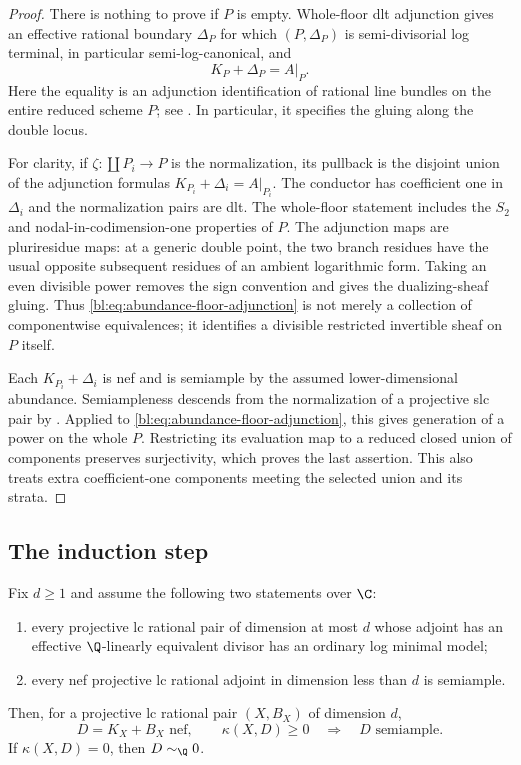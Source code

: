 \begin{proof}
There is nothing to prove if $P$ is empty.  Whole-floor dlt
adjunction gives an effective rational boundary $\Delta_P$ for
which $(P,\Delta_P)$ is semi-divisorial log terminal, in particular
semi-log-canonical, and
\begin{equation}
 K_P+\Delta_P=A|_P.
 \label{bl:eq:abundance-floor-adjunction}
\end{equation}
Here the equality is an adjunction identification of rational line
bundles on the entire reduced scheme $P$; see
\cite[Remark~2.7]{FujinoGongyo2014}.  In particular, it specifies the
gluing along the double locus.

For clarity, if $\zeta:\coprod P_i\to P$ is the normalization,
its pullback is the disjoint union of the adjunction formulas
$K_{P_i}+\Delta_i=A|_{P_i}$.  The conductor has coefficient one in
$\Delta_i$ and the normalization pairs are dlt.  The whole-floor
statement includes the $S_2$ and nodal-in-codimension-one properties
of $P$.  The adjunction maps are pluriresidue maps: at a generic
double point, the two branch residues have the usual opposite
subsequent residues of an ambient logarithmic form.  Taking an
even divisible power removes the sign convention and gives the
dualizing-sheaf gluing.  Thus \eqref{bl:eq:abundance-floor-adjunction}
is not merely a collection of componentwise equivalences; it
identifies a divisible restricted invertible sheaf on $P$ itself.

Each $K_{P_i}+\Delta_i$ is nef and is semiample by the assumed
lower-dimensional abundance.  Semiampleness descends from the
normalization of a projective slc pair by
\cite[Theorem~4.3, equivalently Theorem~1.5]{FujinoGongyo2014}.
Applied to \eqref{bl:eq:abundance-floor-adjunction}, this gives
generation of a power on the whole $P$.  Restricting its evaluation
map to a reduced closed union of components preserves surjectivity,
which proves the last assertion.  This also treats extra
coefficient-one components meeting the selected union and its strata.
\end{proof}

\subsection{The induction step}

\begin{proposition}
\label{bl:prop:abundance-induction}
Fix $d\geq1$ and assume the following two statements over $\C$:
\begin{enumerate}
 \item every projective lc rational pair of dimension at most $d$
 whose adjoint has an effective $\Q$-linearly equivalent divisor
 has an ordinary log minimal model;
 \item every nef projective lc rational adjoint in dimension less
 than $d$ is semiample.
\end{enumerate}
Then, for a projective lc rational pair $(X,B_X)$ of dimension $d$,
\[
 D=K_X+B_X\text{ nef},\qquad \kappa(X,D)\geq0
 \quad\Longrightarrow\quad D\text{ semiample}.
\]
If $\kappa(X,D)=0$, then $D\sim_{\Q}0$.
\end{proposition}

